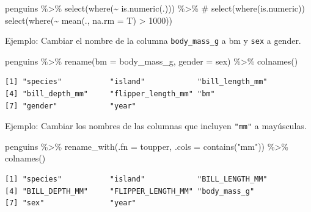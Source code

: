 \documentclass[
  letterpaper,
  DIV=11,
  numbers=noendperiod]{scrreprt}
\newenvironment{Shaded}{\begin{snugshade}}{\end{snugshade}}
\newcommand{\AttributeTok}[1]{\textcolor[rgb]{0.40,0.45,0.13}{#1}}
\newcommand{\CommentTok}[1]{\textcolor[rgb]{0.37,0.37,0.37}{#1}}
\newcommand{\DecValTok}[1]{\textcolor[rgb]{0.68,0.00,0.00}{#1}}
\newcommand{\FunctionTok}[1]{\textcolor[rgb]{0.28,0.35,0.67}{#1}}
\newcommand{\NormalTok}[1]{\textcolor[rgb]{0.00,0.23,0.31}{#1}}
\newcommand{\SpecialCharTok}[1]{\textcolor[rgb]{0.37,0.37,0.37}{#1}}
\newcommand{\StringTok}[1]{\textcolor[rgb]{0.13,0.47,0.30}{#1}}
\begin{document}
\begin{Shaded}
\begin{Highlighting}[]
\NormalTok{penguins }\SpecialCharTok{\%\textgreater{}\%} 
  \FunctionTok{select}\NormalTok{(}\FunctionTok{where}\NormalTok{(}\SpecialCharTok{\textasciitilde{}} \FunctionTok{is.numeric}\NormalTok{(.))) }\SpecialCharTok{\%\textgreater{}\%}  \CommentTok{\# select(where(is.numeric))}
  \FunctionTok{select}\NormalTok{(}\FunctionTok{where}\NormalTok{(}\SpecialCharTok{\textasciitilde{}} \FunctionTok{mean}\NormalTok{(., }\AttributeTok{na.rm =}\NormalTok{ T) }\SpecialCharTok{\textgreater{}} \DecValTok{1000}\NormalTok{))}
\end{Highlighting}
\end{Shaded}

{Ejemplo}: Cambiar el nombre de la columna \texttt{body\_mass\_g} a bm y
\texttt{sex} a gender.

\begin{Shaded}
\begin{Highlighting}[]
\NormalTok{penguins }\SpecialCharTok{\%\textgreater{}\%} \FunctionTok{rename}\NormalTok{(}\AttributeTok{bm =}\NormalTok{ body\_mass\_g, }\AttributeTok{gender =}\NormalTok{ sex) }\SpecialCharTok{\%\textgreater{}\%} 
  \FunctionTok{colnames}\NormalTok{()}
\end{Highlighting}
\end{Shaded}

\begin{verbatim}
[1] "species"           "island"            "bill_length_mm"   
[4] "bill_depth_mm"     "flipper_length_mm" "bm"               
[7] "gender"            "year"             
\end{verbatim}

{Ejemplo}: Cambiar los nombres de las columnas que incluyen
\texttt{"mm"} a mayúsculas.

\begin{Shaded}
\begin{Highlighting}[]
\NormalTok{penguins }\SpecialCharTok{\%\textgreater{}\%} \FunctionTok{rename\_with}\NormalTok{(}\AttributeTok{.fn =}\NormalTok{ toupper, }\AttributeTok{.cols =} \FunctionTok{contains}\NormalTok{(}\StringTok{"mm"}\NormalTok{)) }\SpecialCharTok{\%\textgreater{}\%} 
  \FunctionTok{colnames}\NormalTok{()}
\end{Highlighting}
\end{Shaded}

\begin{verbatim}
[1] "species"           "island"            "BILL_LENGTH_MM"   
[4] "BILL_DEPTH_MM"     "FLIPPER_LENGTH_MM" "body_mass_g"      
[7] "sex"               "year"             
\end{verbatim}
\end{document}
